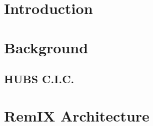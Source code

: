\documentclass{sig-alternate-10pt}
\begin{document}
\begin{abstract}
\begin{comment}
Rural access networks are designed to bridge the `last-mile' broadband
gap in regions that are under-served by traditional broadband
providers. Their construction is bespoke, driven by their
beneficiaries, and determined by physical landscape, population
distribution, and monetary budget. Irrespective of their differences,
they are joined by one substantial challenge: connecting to the rest
of the Internet is prohibitively expensive. HUBS \textsc{c.i.c} was
created in Scotland to respond to this. It is a co-operative of access
network members that generates the economies of scale required to
afford backhaul and Internet transit. While intermediation at the IP
layer between the members and the Internet is required for reasons of
scale, it is neither necessary nor desirable amongst the member
networks themselves. In urban areas, networks could interconnect with
each other at an Internet Exchange Point (IXP). In Scotland where the
networks are scattered across 80,000km$^2$ of mountain, field, and sea
it is not so easy. We bridge this gap with a design for a distributed
Internet exchange for access networks in remote places. Doing so
allows for bilateral arrangements for mutual support and assistance
between these networks, and increases the resilience of access network
connectivity. We present the relevant components, and describe our
implementation, so that our efforts may be reproduced.
\end{comment} %
\end{abstract}


%
%

\section{Introduction} \label{sec:intro} 

\section{Background} \label{sec:context} 
\subsection{HUBS C.I.C.}\label{subsec:hubs}

\section{RemIX Architecture} \label{sec:arch} 
\end{document}

